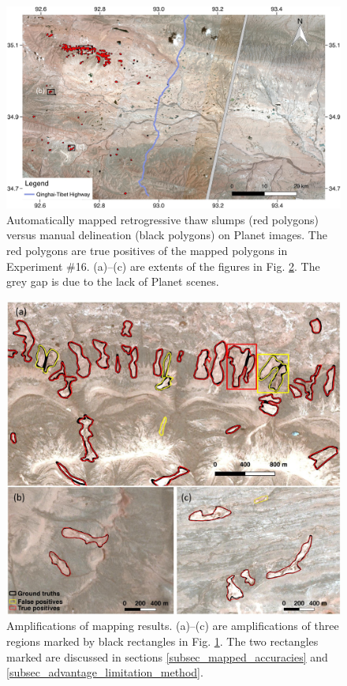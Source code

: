\documentclass[authoryear,preprint,review,12pt]{elsarticle}
\begin{document}
\begin{figure}
	\centering
	\includegraphics[width=14cm]{figures/whole_area_mapped_trim.jpg}
	\caption{Automatically mapped retrogressive thaw slumps (red polygons) versus manual delineation (black polygons) on Planet images. The red polygons are true positives of the mapped polygons in Experiment \#16. (a)--(c) are extents of the figures in Fig. \ref{fig_zoomin_mapped_rts}. The grey gap is due to the lack of Planet scenes.}
	\label{fig_mapped_rts}
\end{figure}

\begin{figure}
	\centering
	\includegraphics[width=12cm]{figures/zoom_in_mapped_polygons_trim.jpg}
	\caption{Amplifications of mapping results. (a)--(c) are amplifications of three regions marked by black rectangles in Fig. \ref{fig_mapped_rts}. The two rectangles marked are discussed in sections \ref{subsec_mapped_accuracies} and \ref{subsec_advantage_limitation_method}.}
	\label{fig_zoomin_mapped_rts}
\end{figure}
\end{document}
